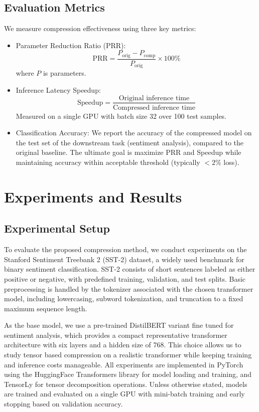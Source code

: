 \documentclass[conference]{IEEEtran}
\begin{document}
\subsection{Evaluation Metrics}
We measure compression effectiveness using three key metrics:
\begin{itemize}
    \item Parameter Reduction Ratio (PRR):
        \[
        \mathrm{PRR}
        = \frac{P_{\text{orig}} - P_{\text{comp}}}{P_{\text{orig}}} \times 100\%
        \]
        where $P$ is parameters.
    \item Inference Latency Speedup:
        \[
        \mathrm{Speedup}
        = \frac{\text{Original inference time}}
            {\text{Compressed inference time}}
        \]
        Measured on a single GPU with batch size 32 over 100 test samples.
    \item Classification Accuracy:
    We report the accuracy of the compressed model on the test set of the downstream task (sentiment analysis), compared to the
    original baseline. The ultimate goal is maximize PRR and Speedup while maintaining accuracy within acceptable threshold
    (typically $< 2\%$ loss).
\end{itemize}


\section{Experiments and Results}

\subsection{Experimental Setup}
To evaluate the proposed compression method, we conduct experiments on the Stanford Sentiment Treebank 2 (SST-2) dataset,
a widely used benchmark for binary sentiment classification. SST-2 consists of short sentences labeled as either positive
or negative, with predefined training, validation, and test splits. Basic preprocessing is handled by the tokenizer
associated with the chosen transformer model, including lowercasing, subword tokenization, and truncation to a fixed maximum
sequence length.

As the base model, we use a pre-trained DistilBERT variant fine tuned for sentiment analysis, which provides a compact
representative transformer architecture with six layers and a hidden size of 768. This choice allows us to study
tensor based compression on a realistic transformer while keeping training and inference costs manageable.
All experiments are implemented in PyTorch using the HuggingFace Transformers library for model loading and training,
and TensorLy for tensor decomposition operations. Unless otherwise stated, models are trained and evaluated on a single
GPU with mini-batch training and early stopping based on validation accuracy.
\end{document}
